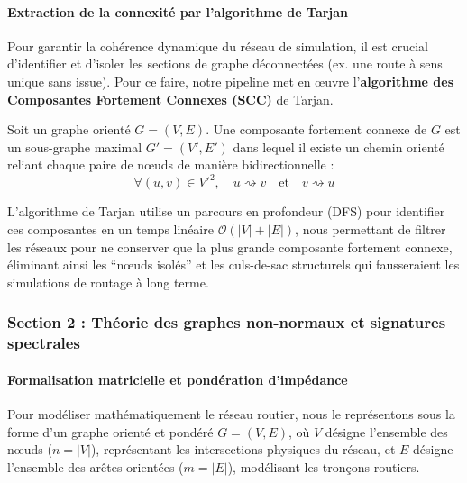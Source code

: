 \documentclass[10pt, a4paper]{article}
\begin{document}
\paragraph{Extraction de la connexité par l'algorithme de
Tarjan}\label{extraction-de-la-connexituxe9-par-lalgorithme-de-tarjan}

Pour garantir la cohérence dynamique du réseau de simulation, il est
crucial d'identifier et d'isoler les sections de graphe déconnectées
(ex. une route à sens unique sans issue). Pour ce faire, notre pipeline
met en œuvre l'\textbf{algorithme des Composantes Fortement Connexes
(SCC)} de Tarjan.

Soit un graphe orienté \(G = (V, E)\). Une composante fortement connexe
de \(G\) est un sous-graphe maximal \(G' = (V', E')\) dans lequel il
existe un chemin orienté reliant chaque paire de nœuds de manière
bidirectionnelle :
\[\forall (u, v) \in V'^2, \quad u \rightsquigarrow v \quad \text{et} \quad v \rightsquigarrow u\]

L'algorithme de Tarjan utilise un parcours en profondeur (DFS) pour
identifier ces composantes en un temps linéaire
\(\mathcal{O}(|V| + |E|)\), nous permettant de filtrer les réseaux pour
ne conserver que la plus grande composante fortement connexe, éliminant
ainsi les ``nœuds isolés'' et les culs-de-sac structurels qui
fausseraient les simulations de routage à long terme.

\subsubsection{Section 2 : Théorie des graphes non-normaux et signatures
spectrales}\label{section-2-thuxe9orie-des-graphes-non-normaux-et-signatures-spectrales}

\paragraph{Formalisation matricielle et pondération
d'impédance}\label{formalisation-matricielle-et-ponduxe9ration-dimpuxe9dance}

Pour modéliser mathématiquement le réseau routier, nous le représentons
sous la forme d'un graphe orienté et pondéré \(G = (V, E)\), où \(V\)
désigne l'ensemble des nœuds (\(n = |V|\)), représentant les
intersections physiques du réseau, et \(E\) désigne l'ensemble des
arêtes orientées (\(m = |E|\)), modélisant les tronçons routiers.
\end{document}
